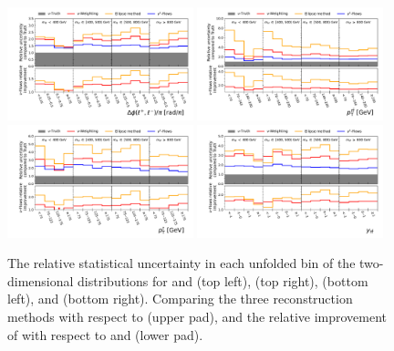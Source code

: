 \begin{figure}[htpb]
    \centering
    \includegraphics[width=0.48\textwidth]{Figures/neutrino_unfolding/unfolding/unfold_error_lep_del_phi_7.pdf}
    \includegraphics[width=0.48\textwidth]{Figures/neutrino_unfolding/unfolding/unfold_error_ttbar_pt_7.pdf} \\
    \includegraphics[width=0.48\textwidth]{Figures/neutrino_unfolding/unfolding/unfold_error_top_pt_7.pdf}
    \includegraphics[width=0.48\textwidth]{Figures/neutrino_unfolding/unfolding/unfold_error_ttbar_rapidity_7.pdf}
    \caption{The relative statistical uncertainty in each unfolded bin of the two-dimensional distributions for \mttbar and \dphill (top left), \pttop (top right), \pttt (bottom left), and \ytt (bottom right).
    Comparing the three reconstruction methods with respect to \vtruth (upper pad), and the relative improvement of \vflows with respect to \vweight and \ellipse (lower pad).}
    \label{fig:stat_gain_unfold_all}
\end{figure}

